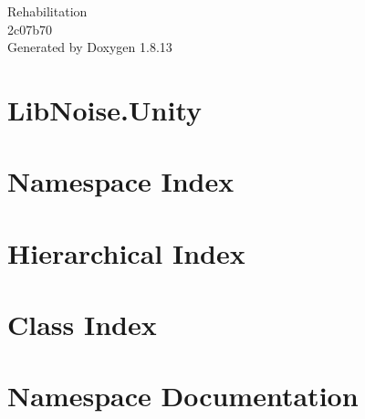 \documentclass[twoside]{book}
\newcommand{\+}{\discretionary{\mbox{\scriptsize$\hookleftarrow$}}{}{}}
\newcommand{\clearemptydoublepage}{%
  \newpage{\pagestyle{empty}\cleardoublepage}%
}
\begin{document}
\hypersetup{pageanchor=false,
             bookmarksnumbered=true,
             pdfencoding=unicode
            }
\begin{titlepage}
\vspace*{7cm}
\begin{center}%
{\Large Rehabilitation \\[1ex]\large 2c07b70 }\\
\vspace*{1cm}
{\large Generated by Doxygen 1.8.13}\\
\end{center}
\end{titlepage}
\clearemptydoublepage
{}
\tableofcontents
\clearemptydoublepage
{}
\hypersetup{pageanchor=true}

\chapter{Lib\+Noise.\+Unity}
\label{md__c_1__users__ristaccia__desktop__rehabilitation__capstone__assets__prefabs__infinite__code__lib_noise__r_e_a_d_m_e}

\chapter{Namespace Index}

\chapter{Hierarchical Index}

\chapter{Class Index}

\chapter{Namespace Documentation}















\end{document}
